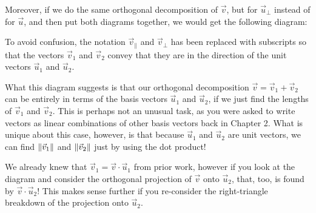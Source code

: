\documentclass{ximera}
\begin{document}
\begin{center}
\end{center}

Moreover, if we do the same orthogonal decomposition of $\vec{v}$, but for $\vec{u}_\perp$ instead of for $\vec{u}$, and then put both diagrams together, we would get the following diagram:

\begin{center}
   
  \end{center}

  To avoid confusion, the notation $\vec{v}_\parallel$ and $\vec{v}_\perp$ has been replaced with subscripts so that the vectors $\vec{v}_1$ and $\vec{v}_2$ convey that they are in the direction of the unit vectors $\vec{u}_1$ and $\vec{u}_2$.

  What this diagram suggests is that our orthogonal decomposition $\vec{v}=\vec{v}_1+\vec{v}_2$ can be entirely in terms of the basis vectors $\vec{u}_1$ and $\vec{u}_2$, if we just find the lengths of $\vec{v}_1$ and $\vec{v}_2$. This is perhaps not an unusual task, as you were asked to write vectors as linear combinations of other basis vectors back in Chapter 2. What is unique about this case, however, is that because $\vec{u}_1$ and $\vec{u}_2$ are unit vectors, we can find $\left\|\vec{v}_1\right\|$ and $\left\|\vec{v}_2\right\|$ just by using the dot product!

  We already knew that $\vec{v}_1=\vec{v}\cdot\vec{u}_1$ from prior work, however if you look at the diagram and consider the orthogonal projection of $\vec{v}$ onto $\vec{u}_2$, that, too, is found by $\vec{v}\cdot\vec{u}_2$! This makes sense further if you re-consider the right-triangle breakdown of the projection onto $\vec{u}_2$.
\end{document}
